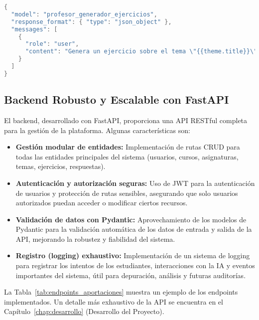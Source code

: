 \begin{lstlisting}[language=java,caption={Ejemplo de plantilla de prompt (formato JSON simplificado) para la generación de ejercicios.},label={lst:prompt_aportaciones},basicstyle=\fontsize{8}{9.5}\ttfamily]
{
  "model": "profesor_generador_ejercicios",
  "response_format": { "type": "json_object" },
  "messages": [
    {
      "role": "user",
      "content": "Genera un ejercicio sobre el tema \"{{theme.title}}\" con un nivel de dificultad {{difficulty}}. El formato de la respuesta esperada debe ser {{exercise_response_type}}. "
    }
  ]
}
\end{lstlisting}

\subsection{Backend Robusto y Escalable con FastAPI}
\label{ssec:backend_aportaciones}

El backend, desarrollado con FastAPI, proporciona una API RESTful completa para la gestión de la plataforma. Algunas características son:
\begin{itemize}
    \item \textbf{Gestión modular de entidades:} Implementación de rutas CRUD para todas las entidades principales del sistema (usuarios, cursos, asignaturas, temas, ejercicios, respuestas).
    \item \textbf{Autenticación y autorización seguras:} Uso de JWT para la autenticación de usuarios y protección de rutas sensibles, asegurando que solo usuarios autorizados puedan acceder o modificar ciertos recursos.
    \item \textbf{Validación de datos con Pydantic:} Aprovechamiento de los modelos de Pydantic para la validación automática de los datos de entrada y salida de la API, mejorando la robustez y fiabilidad del sistema.
    \item \textbf{Registro (logging) exhaustivo:} Implementación de un sistema de logging para registrar los intentos de los estudiantes, interacciones con la IA y eventos importantes del sistema, útil para depuración, análisis y futuras auditorías.
\end{itemize}
La Tabla~\ref{tab:endpoints_aportaciones} muestra un ejemplo de los endpoints implementados. Un detalle más exhaustivo de la API se encuentra en el Capítulo~\ref{chap:desarrollo} (Desarrollo del Proyecto).

